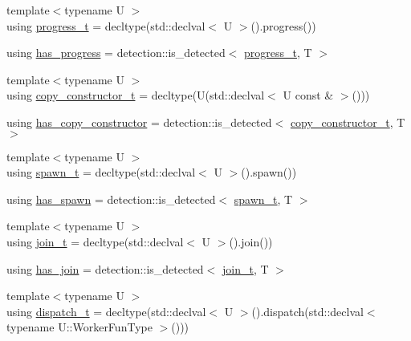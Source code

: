 \begin{DoxyCompactItemize}
\item 
{\footnotesize template$<$typename U $>$ }\\using \hyperlink{structvt_1_1worker_1_1_worker_traits_a0cda24a5c8ac86e6877aaa24b23034fd}{progress\+\_\+t} = decltype(std\+::declval$<$ U $>$().progress())
\item 
using \hyperlink{structvt_1_1worker_1_1_worker_traits_a431244d14714cc2bad0293ada8afb2e4}{has\+\_\+progress} = detection\+::is\+\_\+detected$<$ \hyperlink{structvt_1_1worker_1_1_worker_traits_a0cda24a5c8ac86e6877aaa24b23034fd}{progress\+\_\+t}, T $>$
\item 
{\footnotesize template$<$typename U $>$ }\\using \hyperlink{structvt_1_1worker_1_1_worker_traits_a5018e778cb47740877e26c016a077e78}{copy\+\_\+constructor\+\_\+t} = decltype(U(std\+::declval$<$ U const  \& $>$()))
\item 
using \hyperlink{structvt_1_1worker_1_1_worker_traits_a426f21bc7d1913681a26c10b58ee5d0b}{has\+\_\+copy\+\_\+constructor} = detection\+::is\+\_\+detected$<$ \hyperlink{structvt_1_1worker_1_1_worker_traits_a5018e778cb47740877e26c016a077e78}{copy\+\_\+constructor\+\_\+t}, T $>$
\item 
{\footnotesize template$<$typename U $>$ }\\using \hyperlink{structvt_1_1worker_1_1_worker_traits_ab1c6768c82bad9bb5a911b5a676788a3}{spawn\+\_\+t} = decltype(std\+::declval$<$ U $>$().spawn())
\item 
using \hyperlink{structvt_1_1worker_1_1_worker_traits_abe1fbf0bbaefdbf7ad3fa761aca06bc6}{has\+\_\+spawn} = detection\+::is\+\_\+detected$<$ \hyperlink{structvt_1_1worker_1_1_worker_traits_ab1c6768c82bad9bb5a911b5a676788a3}{spawn\+\_\+t}, T $>$
\item 
{\footnotesize template$<$typename U $>$ }\\using \hyperlink{structvt_1_1worker_1_1_worker_traits_a69a3d1b3845fdac60940d2b3e6a6b240}{join\+\_\+t} = decltype(std\+::declval$<$ U $>$().join())
\item 
using \hyperlink{structvt_1_1worker_1_1_worker_traits_a3e5bb1748dd46eb95c0507016e009ae0}{has\+\_\+join} = detection\+::is\+\_\+detected$<$ \hyperlink{structvt_1_1worker_1_1_worker_traits_a69a3d1b3845fdac60940d2b3e6a6b240}{join\+\_\+t}, T $>$
\item 
{\footnotesize template$<$typename U $>$ }\\using \hyperlink{structvt_1_1worker_1_1_worker_traits_ae3d04fe828e40c570a63b969b982e5d4}{dispatch\+\_\+t} = decltype(std\+::declval$<$ U $>$().dispatch(std\+::declval$<$ typename U\+::\+Worker\+Fun\+Type $>$()))

\end{DoxyCompactItemize}

